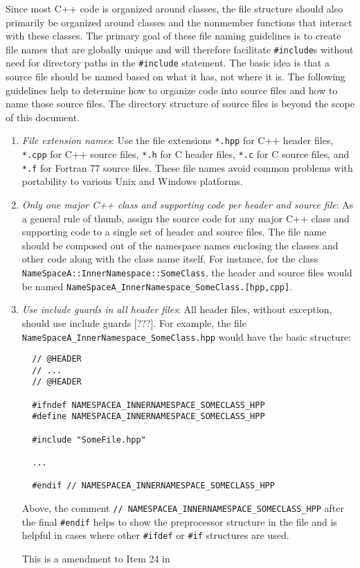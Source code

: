 Since most C++ code is organized around classes, the file structure should
also primarily be organized around classes and the nonmember functions that
interact with these classes.  The primary goal of these file naming guidelines
is to create file names that are globally unique and will therefore facilitate
{}\texttt{\#include}s without need for directory paths in the
{}\texttt{\#include} statement.  The basic idea is that a source file should
be named based on what it has, not where it is.  The following guidelines help
to determine how to organize code into source files and how to name those
source files.  The directory structure of source files is beyond the scope of
this document.

\begin{enumerate}

{}\item\textit{File extension names}: Use the file extensions {}\texttt{*.hpp}
for C++ header files, {}\texttt{*.cpp} for C++ source files, {}\texttt{*.h}
for C header files, {}\texttt{*.c} for C source files, and {}\texttt{*.f} for
Fortran 77 source files.  These file names avoid common problems with
portability to various Unix and Windows platforms.

{}\item\textit{Only one major C++ class and supporting code per header and
source file}: As a general rule of thumb, assign the source code for any major
C++ class and supporting code to a single set of header and source files.  The
file name should be composed out of the namespace names enclosing the classes
and other code along with the class name itself.  For instance, for the class
{}\texttt{NameSpaceA\-::InnerNamespace\-::SomeClass}, the header and source
files would be named
{}\texttt{NameSpaceA\-\_InnerNamespace\-\_SomeClass.[hpp,cpp]}.

{}\item\textit{Use include guards in all header files}: All header files,
without exception, should use include guards [???].  For example, the file
{}\texttt{NameSpaceA\-\_InnerNamespace\-\_SomeClass.hpp} would have the basic
structure:

{\small\begin{verbatim}
  // @HEADER
  // ...
  // @HEADER

  #ifndef NAMESPACEA_INNERNAMESPACE_SOMECLASS_HPP
  #define NAMESPACEA_INNERNAMESPACE_SOMECLASS_HPP

  #include "SomeFile.hpp"

  ...

  #endif // NAMESPACEA_INNERNAMESPACE_SOMECLASS_HPP
\end{verbatim}}

Above, the comment {}\texttt{//
NAMESPACEA\-\_INNERNAMESPACE\-\_SOMECLASS\-\_HPP} after the final
{}\texttt{\#endif} helps to show the preprocessor structure in the file and is
helpful in cases where other {}\texttt{\#ifdef} or {}\texttt{\#if} structures
are used.

This is a amendment to Item 24 in {}\cite{C++CodingStandards05}

\end{enumerate}

